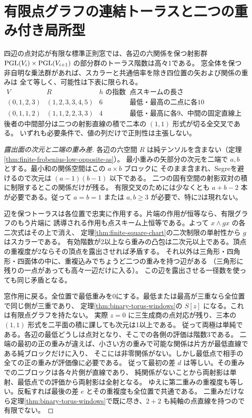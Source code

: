 \section{有限点グラフの連結トーラスと二つの重み付き局所型}
\label{sec:finite-torus-profiles}
\begin{theorem}\label{thm:finite-torus-profiles}
四辺の点対応が有限な標準正則窓では、各辺の六関係を保つ射影群
$\operatorname{PGL}(V_i)\times\operatorname{PGL}(V_{i+1})$ の部分群のトーラス階数は高々1である。
窓全体を保つ非自明な乗法群があれば、スカラーと共通倍率を除き四位置の矢および関係の重みは
全て等しく、可能性は下表に限られる。
\[
\begin{array}{c|c|c|l}
 V & R & h\text{ の指数}&\text{点スキームの長さ}\\\hline
 (0,1,2,3)&(1,2,3,3,4,5)&6&\text{最低・最高の二点に各10}\\
 (0,1,1,2)&(1,1,2,2,3,3)&4&\text{最低・最高に各9、中間の固定直線上に計2}
\end{array}
\]
後者の中間部分は二つの射影直線の積で二本の $(1,1)$ 形式が切る全交叉である。
いずれも必要条件で、値の列だけで正則性は主張しない。
\end{theorem}

\begin{proof}[露出面の次元と二端の重み差]
各辺の六空間 $R$ は純テンソルを含まない（定理\ref{thm:finite-frobenius-low-opposite-as}）。
最小重みの矢部分の次元を二端で $a,b$ とする。最小和の関係空間はこの $a\times b$ ブロックに
そのまま含まれ、Segreを避けるので次元は $(a-1)(b-1)$ 以下である。
二つの固有空間の射影双対の積に制限するとこの関係だけが残る。
有限交叉のためには少なくとも $a+b-2$ 本が必要である。従って $a=b=1$ または $a,b\ge3$ が必要で、特に2は現れない。

辺を保つトーラスは各位置で忠実に作用する。片端の作用が恒等なら、有限グラフのもう片端に
誘導される作用も点スキーム上恒等である。よって $x\wedge gx$ の各二次式はその上で消え、
定理\ref{thm:finite-square-chart}の二次制限の単射性から $g$ はスカラーである。
有効階数が2以上なら重みの凸包は二次元以上である。頂点の重複度が2ならその頂点を露出させれば矛盾する。
それ以外は三角形・四角形・四面体の中に、重複込みでちょうど二つの重みを持つ辺がある
（三角形に残りの一点があっても高々一辺だけに入る）。
この辺を露出させる一径数を使っても同じ矛盾となる。

窓作用に戻る。全位置で最低重みを0にする。最低または最高が三重なら全位置で同じ側が三重であり、
定理\ref{thm:binary-torus-windows}の $S[z]$ になる。これは有限点グラフを持たない。
実際 $z=0$ に三生成商の点対応が残り、三本の $(1,1)$ 形式を二平面の積に課しても次元は1以上である。
従って両極は単純である。各辺の最低どうしは点対となり、そこでの各側の評価は階数3である。
二端の最初の正の重みが違えば、小さい方の重みで可能な関係は片方が最低直線である純ブロックだけに入り、
そこには非零関係がない。しかし最低点で相手の全ての正の重みが評価像に必要である。
従って最初の差 $d$ は等しい。その重みでの二ブロックは各々片側が直線であり、
純関係がないことから両射影は単射、最低点での評価から両射影は全射となる。
ゆえに第二重みの重複度も等しい。反転すれば最後の差 $e$ とその重複度も全位置で共通である。
二重みだけなら定理\ref{thm:binary-torus-windows}で既に尽き、$2+2$ も純軸の点直線を持つので有限でない。
\end{proof}

